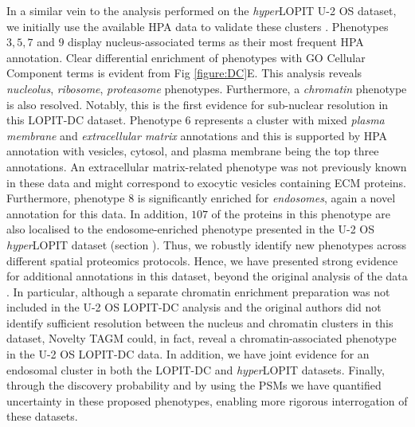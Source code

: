 \documentclass[12pt,english]{article}
\begin{document}
In a similar vein to the analysis performed on the \textit{hyper}LOPIT U-2 OS dataset, we initially use the available HPA data to validate these clusters \citep{Thul:2017}. Phenotypes $3,5,7$ and $9$ display nucleus-associated terms as their most frequent HPA annotation. Clear differential enrichment of phenotypes with GO Cellular Component terms is evident from Fig \ref{figure:DC}E. This analysis reveals \textit{nucleolus}, \textit{ribosome}, \textit{proteasome} phenotypes. Furthermore, a \textit{chromatin} phenotype is also resolved. Notably, this is the first evidence for sub-nuclear resolution in this LOPIT-DC dataset. Phenotype $6$ represents a cluster with mixed \textit{plasma membrane} and \textit{extracellular matrix} annotations and this is supported by HPA annotation with vesicles, cytosol, and plasma membrane being the top three annotations. An extracellular matrix-related phenotype was not previously known in these data and might correspond to exocytic vesicles containing ECM proteins. Furthermore, phenotype $8$ is significantly enriched for \textit{endosomes}, again a novel annotation for this data. In addition, $107$ of the proteins in this phenotype are also localised to the endosome-enriched phenotype presented in the U-2 OS \textit{hyper}LOPIT dataset (section ). Thus, we robustly identify new phenotypes across different spatial proteomics protocols. Hence, we have presented strong evidence for additional annotations in this dataset, beyond the original analysis of the data \citep{DC:2018}. In particular, although a separate chromatin enrichment preparation was not included in the U-2 OS LOPIT-DC analysis and the original authors did not identify sufficient resolution between the nucleus and chromatin clusters in this dataset, Novelty TAGM could, in fact, reveal a chromatin-associated phenotype in the U-2 OS LOPIT-DC data. In addition, we have joint evidence for an endosomal cluster in both the LOPIT-DC and \textit{hyper}LOPIT datasets. Finally, through the discovery probability and by using the PSMs we have quantified uncertainty in these proposed phenotypes, enabling more rigorous interrogation of these datasets.


 
\end{document}
